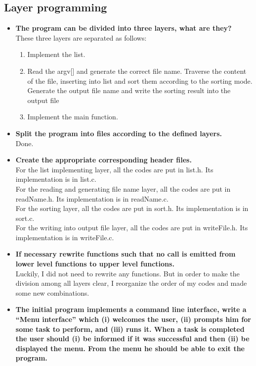 \documentclass{article}
\begin{document}
\begin{spacing}{1.5}
\section{Layer programming}
\begin{itemize}
    \item \textbf{The program can be divided into three layers, what are they?}\\
    These three layers are separated as follows:
    \begin{enumerate}
    	\item Implement the list. 
        \item Read the argv[] and generate the correct file name. Traverse the content of the file, inserting into list and sort them according to the sorting mode. Generate the output file name and write the sorting result into the output file
        \item Implement the main function.
    \end{enumerate}
    \item \textbf{Split the program into files according to the defined layers.}\\
    Done.
    \item \textbf{Create the appropriate corresponding header files.}\\
    For the list implementing layer, all the codes are put in list.h. Its implementation is in list.c.\\
    For the reading and generating file name layer, all the codes are put in readName.h. Its implementation is in readName.c.\\
    For the sorting layer, all the codes are put in sort.h. Its implementation is in sort.c.\\
    For the writing into output file layer, all the codes are put in writeFile.h. Its implementation is in writeFile.c.
    \item \textbf{If necessary rewrite functions such that no call is emitted from lower level functions to upper level functions.}\\
    Luckily, I did not need to rewrite any functions. But in order to make the division among all layers clear, I reorganize the order of my codes and made some new combinations.
    \item \textbf{The initial program implements a command line interface, write a “Menu interface” which (i) welcomes the user, (ii) prompts him for some task to perform, and (iii) runs it. When a task is completed the user should (i) be informed if it was successful and then (ii) be displayed the menu. From the menu he should be able to exit the program.}\\

\end{itemize}
\end{spacing}
\end{document}
